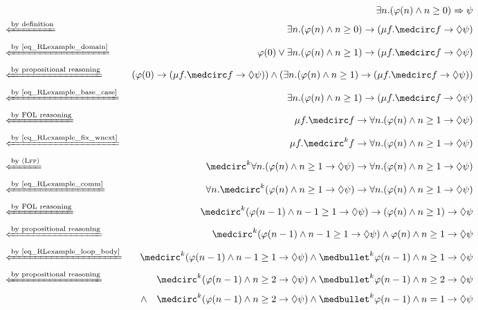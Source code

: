 \documentclass{amsart}
\begin{document}
\begin{figure}
{
\small
\begin{align*}
&&
\exists n . (\varphi(n) \wedge n \ge 0) \To \psi
\\
&\xif{by definition}&
\exists n . (\varphi(n) \wedge n \ge 0) \imp (\mu f . \wnext f 
\imp \eventually\psi)
\\
&\xif{by~\eqref{eq_RLexample_domain}}&
\varphi(0) \vee \exists n . (\varphi(n) \wedge n \ge 1)
\imp (\mu f . \wnext f \imp\eventually \psi)
\\
&\xif{by propositional reasoning}&
(\varphi(0) \imp (\mu f . \wnext f \imp\eventually \psi))
\wedge (\exists n . (\varphi(n) \wedge n \ge 1)
\imp (\mu f . \wnext f \imp\eventually \psi))
\\
&\xif{by~\eqref{eq_RLexample_base_case}}&
\exists n . (\varphi(n) \wedge n \ge 1)
\imp (\mu f . \wnext f \imp\eventually \psi)
\\
&\xif{by FOL reasoning}&
\mu f . \wnext f \imp \forall n .
(\varphi(n) \wedge n \ge 1 \imp \eventually \psi)
\\
&\xif{by~\eqref{eq_RLexample_fix_wnext}}&
\mu f . \wnext^k f \imp \forall n .
(\varphi(n) \wedge n \ge 1 \imp \eventually \psi)
\\
&\xif{by~\Lfp}&
\wnext^k \forall n . (\varphi(n) \wedge n \ge 1 \imp \eventually \psi)
\imp
\forall n . (\varphi(n) \wedge n \ge 1 \imp \eventually \psi)
\\
&\xif{by~\eqref{eq_RLexample_comm}}&
\forall n . \wnext^k  (\varphi(n) \wedge n \ge 1 \imp \eventually \psi)
\imp
\forall n . (\varphi(n) \wedge n \ge 1 \imp \eventually \psi)
\\
&\xif{by FOL reasoning}&
\wnext^k  (\varphi(n-1) \wedge n-1 \ge 1 \imp \eventually \psi)
\imp
(\varphi(n) \wedge n \ge 1) \imp \eventually \psi
\\
&\xif{by propositional reasoning}&
\wnext^k  (\varphi(n-1) \wedge n-1 \ge 1 \imp \eventually \psi)
\wedge
\varphi(n) \wedge n \ge 1 \imp \eventually \psi
\\
&\xif{by~\eqref{eq_RLexample_loop_body}}&
\wnext^k  (\varphi(n-1) \wedge n-1 \ge 1 \imp \eventually \psi)
\wedge
\snext^k \varphi(n-1) \wedge n \ge 1 \imp \eventually \psi
\\
&\xif{by propositional reasoning}&
\wnext^k  (\varphi(n-1) \wedge n \ge 2 \imp \eventually \psi)
\wedge \snext^k \varphi(n-1) \wedge n \ge 2 \imp \eventually \psi
\\&&
\wedge\quad
\wnext^k  (\varphi(n-1) \wedge n \ge 2 \imp \eventually \psi)
\wedge \snext^k \varphi(n-1) \wedge n = 1 \imp \eventually \psi

\end{align*}}
\end{figure}
\end{document}
